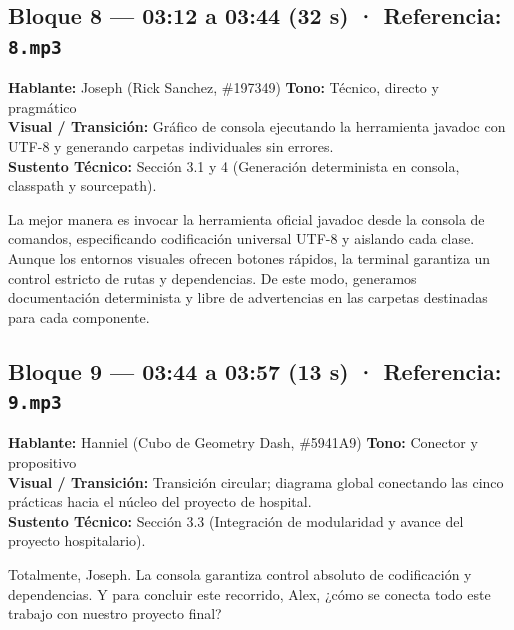 \documentclass[letterpaper,11pt]{article}
\begin{document}
\subsection*{Bloque 8 — 03:12 a 03:44 (32 s) · Referencia: \texttt{8.mp3}}
\textbf{Hablante:} Joseph \textcolor{colorJoseph}{(Rick Sanchez, \#197349)} \hfill \textbf{Tono:} Técnico, directo y pragmático\\
\textbf{Visual / Transición:} Gráfico de consola ejecutando la herramienta javadoc con UTF-8 y generando carpetas individuales sin errores.\\
\textbf{Sustento Técnico:} Sección 3.1 y 4 (Generación determinista en consola, classpath y sourcepath).
\begin{tcolorbox}[colback=colorJoseph!5,colframe=colorJoseph,title=\textbf{Locución Definitiva — Joseph}]
La mejor manera es invocar la herramienta oficial javadoc desde la consola de comandos, especificando codificación universal UTF-8 y aislando cada clase. Aunque los entornos visuales ofrecen botones rápidos, la terminal garantiza un control estricto de rutas y dependencias. De este modo, generamos documentación determinista y libre de advertencias en las carpetas destinadas para cada componente.
\end{tcolorbox}

\subsection*{Bloque 9 — 03:44 a 03:57 (13 s) · Referencia: \texttt{9.mp3}}
\textbf{Hablante:} Hanniel \textcolor{colorHanniel}{(Cubo de Geometry Dash, \#5941A9)} \hfill \textbf{Tono:} Conector y propositivo\\
\textbf{Visual / Transición:} Transición circular; diagrama global conectando las cinco prácticas hacia el núcleo del proyecto de hospital.\\
\textbf{Sustento Técnico:} Sección 3.3 (Integración de modularidad y avance del proyecto hospitalario).
\begin{tcolorbox}[colback=colorHanniel!5,colframe=colorHanniel,title=\textbf{Locución Definitiva — Hanniel}]
Totalmente, Joseph. La consola garantiza control absoluto de codificación y dependencias. Y para concluir este recorrido, Alex, ¿cómo se conecta todo este trabajo con nuestro proyecto final?
\end{tcolorbox}
\end{document}
